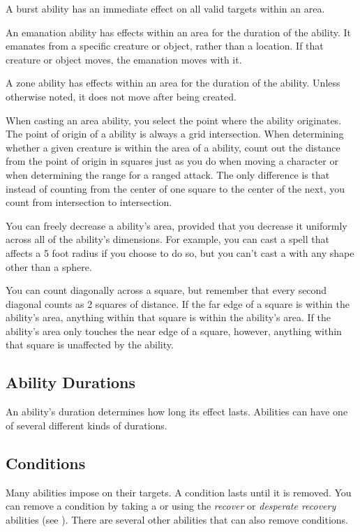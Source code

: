              A burst ability has an immediate effect on all valid targets within an area.

             An emanation ability has effects within an area for the duration of the ability.
            It emanates from a specific creature or object, rather than a location.
            If that creature or object moves, the emanation moves with it.

             A zone ability has effects within an area for the duration of the ability.
            Unless otherwise noted, it does not move after being created.


        When casting an area ability, you select the point where the ability originates.
        The point of origin of a ability is always a grid intersection.
        When determining whether a given creature is within the area of a ability, count out the distance from the point of origin in squares just as you do when moving a character or when determining the range for a ranged attack.
        The only difference is that instead of counting from the center of one square to the center of the next, you count from intersection to intersection.

        You can freely decrease a ability's area, provided that you decrease it uniformly across all of the ability's dimensions.
        For example, you can cast a  spell that affects a 5 foot radius if you choose to do so, but you can't cast a  with any shape other than a sphere.

        You can count diagonally across a square, but remember that every second diagonal counts as 2 squares of distance.
        If the far edge of a square is within the ability's area, anything within that square is within the ability's area.
        If the ability's area only touches the near edge of a square, however, anything within that square is unaffected by the ability.

    \subsection{Ability Durations}

        An ability's duration determines how long its effect lasts.
        Abilities can have one of several different kinds of durations.

        \subsection{Conditions}\label{Conditions}
            Many abilities impose  on their targets.
            A condition lasts until it is removed.
            You can remove a condition by taking a  or using the \textit{recover} or \textit{desperate recovery} abilities (see ).
            There are several other abilities that can also remove conditions.

